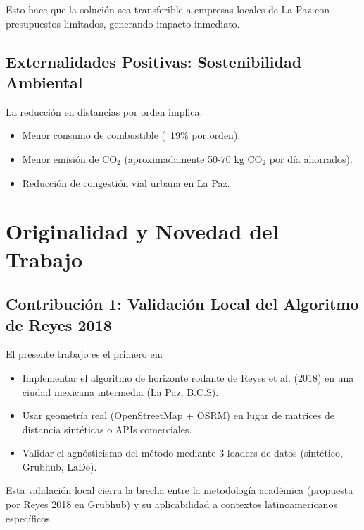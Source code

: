 Esto hace que la solución sea transferible a empresas locales de La Paz 
con presupuestos limitados, generando impacto inmediato.

\subsection{Externalidades Positivas: Sostenibilidad Ambiental}

La reducción en distancias por orden implica:

\begin{itemize}
    \item Menor consumo de combustible (~19\% por orden).
    
    \item Menor emisión de CO$_2$ (aproximadamente 50-70 kg CO$_2$ por día 
    ahorrados).
    
    \item Reducción de congestión vial urbana en La Paz.
\end{itemize}

\section{Originalidad y Novedad del Trabajo}

\subsection{Contribución 1: Validación Local del Algoritmo de Reyes 2018}

El presente trabajo es el primero en:

\begin{itemize}
    \item Implementar el algoritmo de horizonte rodante de Reyes et al. (2018) 
    en una ciudad mexicana intermedia (La Paz, B.C.S).
    
    \item Usar geometría real (OpenStreetMap + OSRM) en lugar de matrices 
    de distancia sintéticas o APIs comerciales.
    
    \item Validar el agnósticismo del método mediante 3 loaders de datos 
    (sintético, Grubhub, LaDe).
\end{itemize}

Esta validación local cierra la brecha entre la metodología académica 
(propuesta por Reyes 2018 en Grubhub) y su aplicabilidad a contextos 
latinoamericanos específicos.

